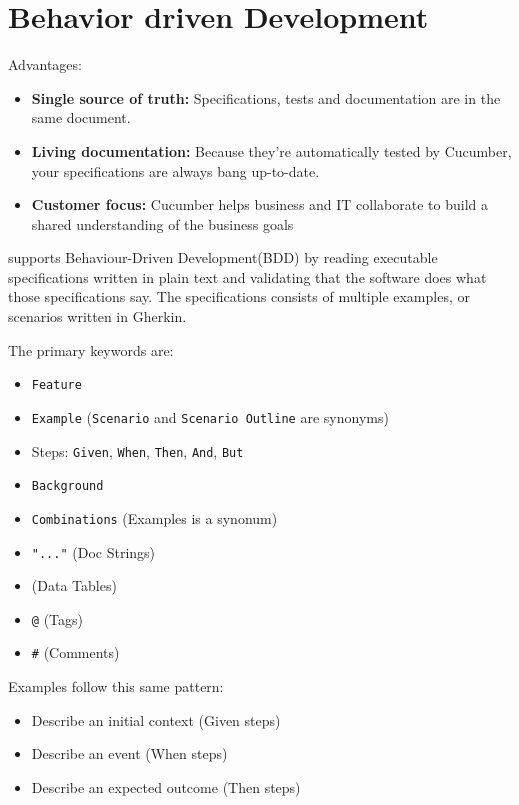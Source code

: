 \documentclass[]{book}
\providecommand{\tightlist}{%
  \setlength{\itemsep}{0pt}\setlength{\parskip}{0pt}}
\begin{document}
\hypertarget{behavior-driven-development}{%
\section{Behavior driven Development}\label{behavior-driven-development}}

Advantages:

\begin{itemize}
\tightlist
\item
  \textbf{Single source of truth:} Specifications, tests and documentation are in the same document.
\item
  \textbf{Living documentation:} Because they're automatically tested by Cucumber, your specifications are always bang up-to-date.
\item
  \textbf{Customer focus:} Cucumber helps business and IT collaborate to build a shared understanding of the business goals
\end{itemize}

\citep{Cucumber2019a} supports Behaviour-Driven Development(BDD) by reading executable specifications written in plain text and validating that the software does what those specifications say. The specifications consists of multiple examples, or scenarios written in Gherkin. \citep{Cucumber2019b}

The primary keywords are:

\begin{itemize}
\item
  \texttt{Feature}
\item
  \texttt{Example} (\texttt{Scenario} and \texttt{Scenario\ Outline} are synonyms)
\item
  Steps: \texttt{Given}, \texttt{When}, \texttt{Then}, \texttt{And}, \texttt{But}
\item
  \texttt{Background}
\item
  \texttt{Combinations} (Examples is a synonum)
\item
  \texttt{"..."} (Doc Strings)
\item
  \texttt{\textbar{}} (Data Tables)
\item
  \texttt{@} (Tags)
\item
  \texttt{\#} (Comments)
\end{itemize}

Examples follow this same pattern:

\begin{itemize}
\tightlist
\item
  Describe an initial context (Given steps)
\item
  Describe an event (When steps)
\item
  Describe an expected outcome (Then steps)
\end{itemize}
\end{document}
